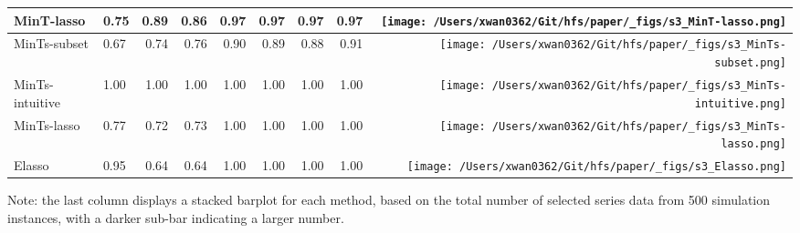 \documentclass[
  11pt]{article}
\begin{document}
\begin{table}
\begin{threeparttable}
\begin{tabular}{llrrrrrr>{}r}
MinT-lasso & 0.75 & 0.89 & 0.86 & 0.97 & 0.97 & 0.97 & 0.97 & \texttt{[image: /Users/xwan0362/Git/hfs/paper/\_figs/s3\_MinT-lasso.png]}\\
\midrule
MinTs-subset & 0.67 & 0.74 & 0.76 & 0.90 & 0.89 & 0.88 & 0.91 & \texttt{[image: /Users/xwan0362/Git/hfs/paper/\_figs/s3\_MinTs-subset.png]}\\
MinTs-intuitive & 1.00 & 1.00 & 1.00 & 1.00 & 1.00 & 1.00 & 1.00 & \texttt{[image: /Users/xwan0362/Git/hfs/paper/\_figs/s3\_MinTs-intuitive.png]}\\
MinTs-lasso & 0.77 & 0.72 & 0.73 & 1.00 & 1.00 & 1.00 & 1.00 & \texttt{[image: /Users/xwan0362/Git/hfs/paper/\_figs/s3\_MinTs-lasso.png]}\\
\midrule
Elasso & 0.95 & 0.64 & 0.64 & 1.00 & 1.00 & 1.00 & 1.00 & \texttt{[image: /Users/xwan0362/Git/hfs/paper/\_figs/s3\_Elasso.png]}\\
\bottomrule
\end{tabular}
\begin{tablenotes}[para]
\item Note: the last column displays a stacked barplot for each method, based on the total number of selected series data from 500 simulation instances, with a darker sub-bar indicating a larger number.
\end{tablenotes}
\end{threeparttable}
\endgroup{}
\end{table}
\end{document}
